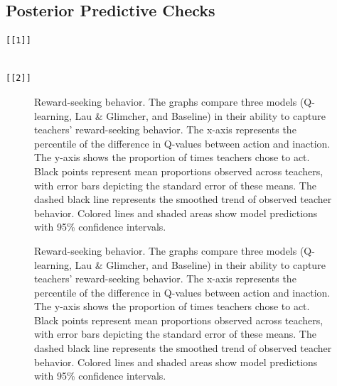 \documentclass[
  number,
  preprint,
  3p,
  onecolumn]{elsarticle}
\begin{document}
\subsection{Posterior Predictive
Checks}\label{posterior-predictive-checks}

\begin{verbatim}
[[1]]
\end{verbatim}

\begin{verbatim}

[[2]]
\end{verbatim}

\begin{figure}


\caption{\label{fig-reward-seeking-1}Reward-seeking behavior. The graphs
compare three models (Q-learning, Lau \& Glimcher, and Baseline) in
their ability to capture teachers' reward-seeking behavior. The x-axis
represents the percentile of the difference in Q-values between action
and inaction. The y-axis shows the proportion of times teachers chose to
act. Black points represent mean proportions observed across teachers,
with error bars depicting the standard error of these means. The dashed
black line represents the smoothed trend of observed teacher behavior.
Colored lines and shaded areas show model predictions with 95\%
confidence intervals.}

\end{figure}%

\begin{figure}


\caption{\label{fig-reward-seeking-2}Reward-seeking behavior. The graphs
compare three models (Q-learning, Lau \& Glimcher, and Baseline) in
their ability to capture teachers' reward-seeking behavior. The x-axis
represents the percentile of the difference in Q-values between action
and inaction. The y-axis shows the proportion of times teachers chose to
act. Black points represent mean proportions observed across teachers,
with error bars depicting the standard error of these means. The dashed
black line represents the smoothed trend of observed teacher behavior.
Colored lines and shaded areas show model predictions with 95\%
confidence intervals.}

\end{figure}%
\end{document}
